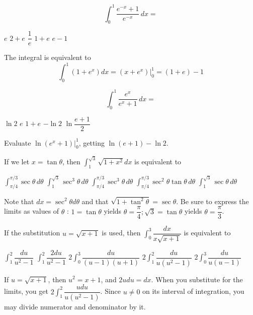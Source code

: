 \question
\[
\int_{0}^{1} \dfrac{e^{-x}+1}{e^{-x}}\,dx=
\]
\begin{choices}
  \CorrectChoice $e$
  \choice $2+e$
  \choice $\dfrac{1}{e}$
  \choice $1+e$
  \choice $e-1$
\end{choices}
\begin{solution}
The integral is equivalent to
\[
\int_{0}^{1}\left(1+e^{x}\right) d x=\left.\left(x+e^{x}\right)\right|_{0} ^{1}=(1+e)-1
\]
\end{solution}




\newpage




\question
\[
\int_{0}^{1} \dfrac{e^{x}}{e^{x}+1}\,dx=
\]
\begin{choices}
  \choice $\ln 2$
  \choice $e$
  \choice $1+e$
  \choice $-\ln 2$
  \CorrectChoice $\ln \dfrac{e+1}{2}$
\end{choices}
\begin{solution}
Evaluate $\left.\ln \left(e^{x}+1\right)\right|_{0} ^{1}$, getting $\ln (e+1)-\ln 2$.
\end{solution}





\question
If we let $x=\tan \theta$, then $\int_{1}^{\sqrt{3}} \sqrt{1+x^{2}} d x$ is equivalent to
\begin{choices}
  \choice $\int_{\pi / 4}^{\pi / 3} \sec \theta\,d\theta$
  \choice $\int_{1}^{\sqrt{3}} \sec ^{3} \theta\,d\theta$
  \CorrectChoice $\int_{\pi / 4}^{\pi / 3} \sec ^{3} \theta\,d\theta$
  \choice $\int_{\pi / 4}^{\pi / 3} \sec ^{2} \theta \tan \theta\,d\theta$
  \choice $\int_{1}^{\sqrt{3}} \sec \theta\,d\theta$
\end{choices}
\begin{solution}
Note that $d x=\sec ^{2} \theta d \theta$ and that $\sqrt{1+\tan ^{2} \theta}=\sec \theta$. Be sure to express the limits as values of $\theta$ : $1=\tan \theta$ yields $\theta=\dfrac{\pi}{4} ; \sqrt{3}=\tan \theta$ yields $\theta=\dfrac{\pi}{3}$.
\end{solution}

\question
If the substitution $u=\sqrt{x+1}$ is used, then $\int_{0}^{3} \dfrac{d x}{x \sqrt{x+1}}$ is equivalent to
\begin{choices}
  \choice $\int_{1}^{2} \dfrac{d u}{u^{2}-1}$
  \CorrectChoice $\int_{1}^{2} \dfrac{2 d u}{u^{2}-1}$
  \choice $2 \int_{0}^{3} \dfrac{d u}{(u-1)(u+1)}$
  \choice $2 \int_{1}^{2} \dfrac{d u}{u\left(u^{2}-1\right)}$
  \choice $2 \int_{0}^{3} \dfrac{d u}{u(u-1)}$
\end{choices}
\begin{solution}
If $u=\sqrt{x+1}$, then $u^{2}=x+1$, and $2 u d u=d x$. When you substitute for the limits, you get $2 \int_{1}^{2} \dfrac{u d u}{u\left(u^{2}-1\right)}$. Since $u \neq 0$ on its interval of integration, you may divide numerator and denominator by it.
\end{solution}




